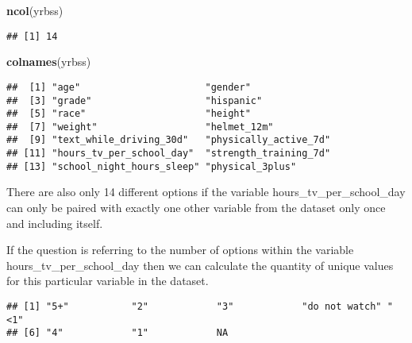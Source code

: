 \documentclass[
]{article}
\newenvironment{Shaded}{\begin{snugshade}}{\end{snugshade}}
\newcommand{\KeywordTok}[1]{\textcolor[rgb]{0.13,0.29,0.53}{\textbf{#1}}}
\newcommand{\NormalTok}[1]{#1}
\newcommand{\OperatorTok}[1]{\textcolor[rgb]{0.81,0.36,0.00}{\textbf{#1}}}
\begin{document}
\begin{Shaded}
\begin{Highlighting}[]
\KeywordTok{ncol}\NormalTok{(yrbss)}
\end{Highlighting}
\end{Shaded}

\begin{verbatim}
## [1] 14
\end{verbatim}

\begin{Shaded}
\begin{Highlighting}[]
\KeywordTok{colnames}\NormalTok{(yrbss)}
\end{Highlighting}
\end{Shaded}

\begin{verbatim}
##  [1] "age"                      "gender"                  
##  [3] "grade"                    "hispanic"                
##  [5] "race"                     "height"                  
##  [7] "weight"                   "helmet_12m"              
##  [9] "text_while_driving_30d"   "physically_active_7d"    
## [11] "hours_tv_per_school_day"  "strength_training_7d"    
## [13] "school_night_hours_sleep" "physical_3plus"
\end{verbatim}

There are also only 14 different options if the variable
hours\_tv\_per\_school\_day can only be paired with exactly one other
variable from the dataset only once and including itself.

If the question is referring to the number of options within the
variable hours\_tv\_per\_school\_day then we can calculate the quantity
of unique values for this particular variable in the dataset.

\begin{Shaded}
\end{Shaded}

\begin{verbatim}
## [1] "5+"           "2"            "3"            "do not watch" "<1"          
## [6] "4"            "1"            NA
\end{verbatim}

\begin{Shaded}
\end{Shaded}
\end{document}
